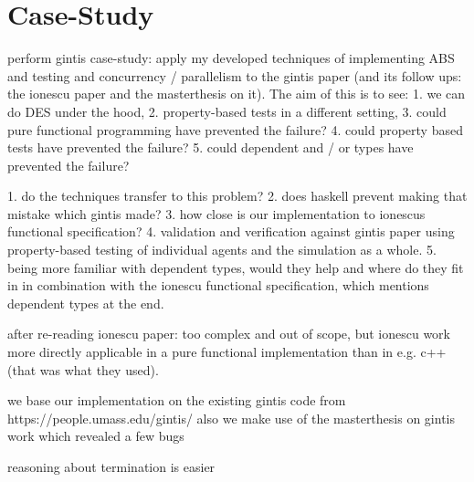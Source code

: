 \section{Case-Study}
perform gintis case-study: apply my developed techniques of implementing ABS and testing and concurrency / parallelism to the gintis paper (and its follow ups: the ionescu paper and the masterthesis on it). 
The aim of this is to see: 
1. we can do DES under the hood, 2. property-based tests in a different setting, 3. could pure functional programming have prevented the failure? 4. could property based tests have prevented the failure? 5. could dependent and / or types have prevented the failure? 

1. do the techniques transfer to this problem? 
2. does haskell prevent making that mistake which gintis made? 
3. how close is our implementation to ionescus functional specification? 
4. validation and verification against gintis paper using property-based testing of individual agents and the simulation as a whole. 
5. being more familiar with dependent types, would they help and where do they fit in in combination with the ionescu functional specification, which mentions dependent types at the end.

after re-reading ionescu paper: too complex and out of scope, but ionescu work more directly applicable in a pure functional implementation than in e.g. c++ (that was what they used).

we base our implementation on the existing gintis code from https://people.umass.edu/gintis/ 
also we make use of the masterthesis on gintis work which revealed a few bugs

reasoning about termination is easier